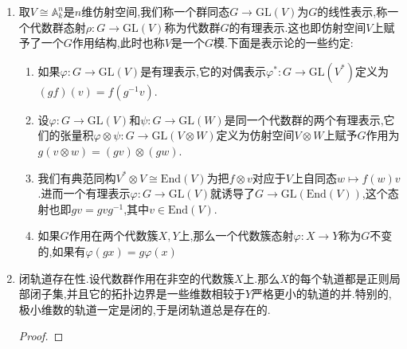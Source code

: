 \begin{enumerate}
\begin{proof}
		$\mathrm{C}_G(H)$是闭子群上一条得证了,对$g\in G$取$H=\langle g\rangle$就有$\mathrm{C}_G(H)=\mathrm{C}_G(g)$.最后让$G$共轭作用在$X=G$上,那么有$\mathrm{N}_G(H)=\mathrm{Tran}_G(H,H)$,上一条得到这是闭子群.
	\end{proof}
	\item 取$V\cong\mathbb{A}_k^n$是$n$维仿射空间,我们称一个群同态$G\to\mathrm{GL}(V)$为$G$的线性表示,称一个代数群态射$\rho:G\to\mathrm{GL}(V)$称为代数群$G$的有理表示.这也即仿射空间$V$上赋予了一个$G$作用结构,此时也称$V$是一个$G$模.下面是表示论的一些约定:
	\begin{enumerate}[(1)]
		\item 如果$\varphi:G\to\mathrm{GL}(V)$是有理表示,它的对偶表示$\varphi^*:G\to\mathrm{GL}(V^*)$定义为$(gf)(v)=f(g^{-1}v)$.
		\item 设$\varphi:G\to\mathrm{GL}(V)$和$\psi:G\to\mathrm{GL}(W)$是同一个代数群的两个有理表示,它们的张量积$\varphi\otimes\psi:G\to\mathrm{GL}(V\otimes W)$定义为仿射空间$V\otimes W$上赋予$G$作用为$g(v\otimes w)=(gv)\otimes(gw)$.
		\item 我们有典范同构$V^*\otimes V\cong\mathrm{End}(V)$为把$f\otimes v$对应于$V$上自同态$w\mapsto f(w)v$.进而一个有理表示$\varphi:G\to\mathrm{GL}(V)$就诱导了$G\to\mathrm{GL}(\mathrm{End}(V))$,这个态射也即$gv=gvg^{-1}$,其中$v\in\mathrm{End}(V)$.
		\item 如果$G$作用在两个代数簇$X,Y$上,那么一个代数簇态射$\varphi:X\to Y$称为$G$不变的,如果有$\varphi(gx)=g\varphi(x)$
	\end{enumerate}
    \item 闭轨道存在性.设代数群作用在非空的代数簇$X$上.那么$X$的每个轨道都是正则局部闭子集,并且它的拓扑边界是一些维数相较于$Y$严格更小的轨道的并.特别的,极小维数的轨道一定是闭的,于是闭轨道总是存在的.
    \begin{proof}
    	

\end{proof}
\end{enumerate}
